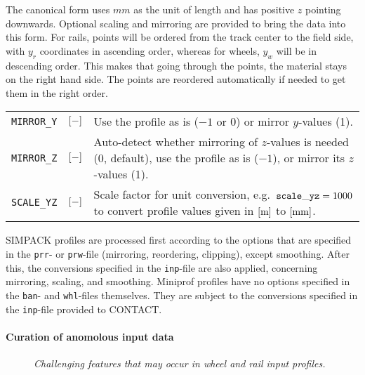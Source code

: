 \documentclass[12pt]{report}
\newenvironment{inputvars}{\vspace{0.4\baselineskip}%

\begin{tabular}{>{\raggedright}p{22mm}p{19mm}p{113mm}}}{
\end{tabular}

}
\newcommand{\inpvar}[3]{{\small\tt #1} & $#2$ & #3 \\[1ex]}
\begin{document}
The canonical form uses $\unit{mm}$ as the unit of length and has positive
$z$ pointing downwards. Optional scaling and mirroring are provided to
bring the data into this form. For rails, points will be ordered from the
track center to the field side, with $y_r$ coordinates in ascending order,
whereas for wheels, $y_w$ will be in descending order. This makes that going
through the points, the material stays on the right hand side.
The points are reordered automatically if needed to get them in the right
order.
\begin{inputvars}
\inpvar{MIRROR\_Y}{\bunit{-}}{Use the profile as is ($-1$ or $0$) or mirror
        $y$-values (1).}
\inpvar{MIRROR\_Z}{\bunit{-}}{Auto-detect whether mirroring of $z$-values is
        needed (0, default), use the profile as is ($-1$), or mirror its
        $z$-values (1).}
\inpvar{SCALE\_YZ}{\bunit{-}}{Scale factor for unit conversion, e.g.\ 
        ${\tt scale\_yz}=1000$ to convert profile values given in $[\mathrm{m}]$
        to $[\mathrm{mm}]$.} 
\end{inputvars}
SIMPACK profiles are processed first according to the options that are
specified in the {\tt prr}- or {\tt prw}-file (mirroring, reordering,
clipping), except smoothing. After this, the conversions specified in the
{\tt inp}-file are also applied, concerning mirroring, scaling, and
smoothing. Miniprof profiles have no options specified in the {\tt ban}-
and {\tt whl}-files themselves. They are subject to the conversions
specified in the {\tt inp}-file provided to CONTACT.

\paragraph{Curation of anomolous input data}

\begin{figure}[bt]
\centering
{}
\caption{\em Challenging features that may occur in wheel and rail input
        profiles.}
\label{fig:profile_errors}
\end{figure}
\end{document}
